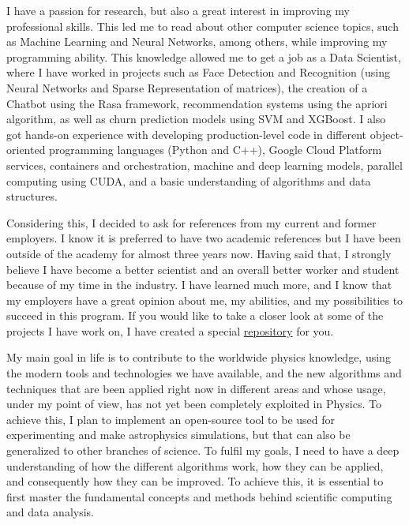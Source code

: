 \documentclass{article}
\begin{document}
\vspace{.5cm}

I have a passion for research, but also a great interest in improving my professional skills. This led me to read about other computer science topics, such as Machine Learning and Neural Networks, among others, while improving my programming ability. This knowledge allowed me to get a job as a Data Scientist, where I have worked in projects such as Face Detection and Recognition (using Neural Networks and Sparse Representation of matrices), the creation of a Chatbot using the Rasa framework, recommendation systems using the apriori algorithm, as well as churn prediction models using SVM and XGBoost. I also got hands-on experience with developing production-level code in different object-oriented programming languages (Python and C++), Google Cloud Platform services, containers and orchestration, machine and deep learning models, parallel computing using CUDA, and a basic understanding of algorithms and data structures. 

\vspace{.5cm}

Considering this, I decided to ask for references from my current and former employers. I know it is preferred to have two academic references but I have been outside of the academy for almost three years now. Having said that, I strongly believe I have become a better scientist and an overall better worker and student because of my time in the industry. I have learned much more, and I know that my employers have a great opinion about me, my abilities, and my possibilities to succeed in this program. If you would like to take a closer look at some of the projects I have work on, I have created a special \href{https://github.com/uzmargomez/master_degree}{repository} for you. 

\vspace{.5cm}

My main goal in life is to contribute to the worldwide physics knowledge, using the modern tools and technologies we have available, and the new algorithms and techniques that are been applied right now in different areas and whose usage, under my point of view, has not yet been completely exploited in Physics. To achieve this, I plan to implement an open-source tool to be used for experimenting and make astrophysics simulations, but that can also be generalized to other branches of science. To fulfil my goals, I need to have a deep understanding of how the different algorithms work, how they can be applied, and consequently how they can be improved. To achieve this, it is essential to first master the fundamental concepts and methods behind scientific computing and data analysis. 
\end{document}

